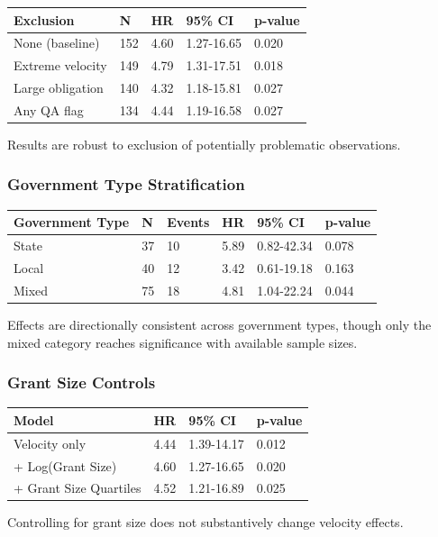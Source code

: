 \documentclass[
  12pt,
  letterpaper,
]{article}
\begin{document}
\begin{longtable}[]{@{}lllll@{}}
\toprule\noalign{}
Exclusion & N & HR & 95\% CI & p-value \\
\midrule\noalign{}
\endhead
\bottomrule\noalign{}
\endlastfoot
None (baseline) & 152 & 4.60 & 1.27-16.65 & 0.020 \\
Extreme velocity & 149 & 4.79 & 1.31-17.51 & 0.018 \\
Large obligation & 140 & 4.32 & 1.18-15.81 & 0.027 \\
Any QA flag & 134 & 4.44 & 1.19-16.58 & 0.027 \\
\end{longtable}

Results are robust to exclusion of potentially problematic observations.

\subsubsection{Government Type
Stratification}\label{government-type-stratification}

\begin{longtable}[]{@{}llllll@{}}
\toprule\noalign{}
Government Type & N & Events & HR & 95\% CI & p-value \\
\midrule\noalign{}
\endhead
\bottomrule\noalign{}
\endlastfoot
State & 37 & 10 & 5.89 & 0.82-42.34 & 0.078 \\
Local & 40 & 12 & 3.42 & 0.61-19.18 & 0.163 \\
Mixed & 75 & 18 & 4.81 & 1.04-22.24 & 0.044 \\
\end{longtable}

Effects are directionally consistent across government types, though
only the mixed category reaches significance with available sample
sizes.

\subsubsection{Grant Size Controls}\label{grant-size-controls}

\begin{longtable}[]{@{}llll@{}}
\toprule\noalign{}
Model & HR & 95\% CI & p-value \\
\midrule\noalign{}
\endhead
\bottomrule\noalign{}
\endlastfoot
Velocity only & 4.44 & 1.39-14.17 & 0.012 \\
+ Log(Grant Size) & 4.60 & 1.27-16.65 & 0.020 \\
+ Grant Size Quartiles & 4.52 & 1.21-16.89 & 0.025 \\
\end{longtable}

Controlling for grant size does not substantively change velocity
effects.
\end{document}
